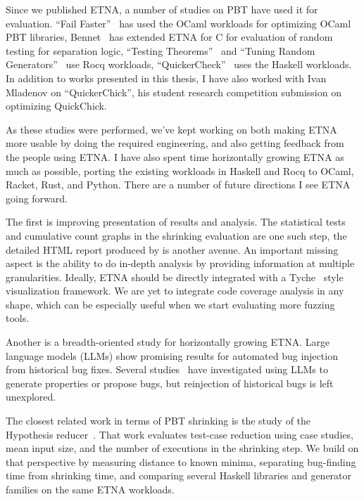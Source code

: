 Since we published ETNA, a number of studies on PBT have used it for evaluation. ``Fail
Faster''~\cite{richey2025failfasterstagingfast} has used the OCaml workloads for
optimizing OCaml PBT libraries, Bennet~\cite{aamer2025bennet} has extended ETNA for C
for evaluation of random testing for separation logic, ``Testing
Theorems''~\cite{testingtheorems} and ``Tuning Random
Generators''~\cite{tjoa2025tuning} use Rocq workloads,
``QuickerCheck''~\cite{QuickerCheck} uses the Haskell workloads. In addition to works
presented in this thesis, I have also worked with Ivan Mladenov on ``QuickerChick'',
his student research competition submission on optimizing QuickChick.

As these studies were performed, we've kept working on both making ETNA more usable by
doing the required engineering, and also getting feedback from the people using ETNA. I
have also spent time horizontally growing ETNA as much as possible, porting the
existing workloads in Haskell and Rocq to OCaml, Racket, Rust, and Python. There are a
number of future directions I see ETNA going forward.

The first is improving presentation of results and analysis. The statistical tests and
cumulative count graphs in the shrinking evaluation are one such step, the detailed
HTML report produced by  is another avenue. An important missing
aspect is the ability to do in-depth analysis by providing information at multiple
granularities. Ideally, ETNA should be directly integrated with a
Tyche~\cite{goldsteinTycheSituExploration2023} style visualization framework. We are
yet to integrate code coverage analysis in any shape, which can be especially useful
when we start evaluating more fuzzing tools.

Another is a breadth-oriented study for horizontally growing ETNA. Large language
models (LLMs) show promising results for automated bug injection from historical bug
fixes. Several studies~\cite{vikram2024llmpbt,etemadi2025llmpbtcps,
  propertygpt2024,jing2026pbtbench} have investigated using LLMs to generate properties
or propose bugs, but reinjection of historical bugs is left unexplored.

The closest related work in terms of PBT shrinking is the study of the Hypothesis
reducer~\cite{HypothesisShrinking}. That work evaluates test-case reduction using case
studies, mean input size, and the number of executions in the shrinking step. We build
on that perspective by measuring distance to known minima, separating bug-finding time
from shrinking time, and comparing several Haskell libraries and generator families on
the same ETNA workloads.

